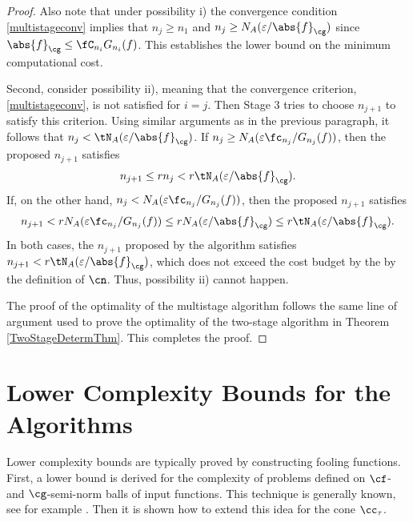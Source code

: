 \documentclass[]{elsarticle}
\theoremstyle{definition}
\theoremstyle{remark}
\newcommand{\Gnorm}[1]{\abs{#1}_{\cg}}
\begin{document}
\begin{proof}
Also note that under possibility i) the convergence condition \eqref{multistageconv} implies that $n_j \ge n_1$ and  $n_j \ge N_{A}(\varepsilon/\Gnorm{f})$ since  $\Gnorm{f} \le \fC_{n_i} G_{n_i}(f)$.  This establishes the lower bound on the minimum computational cost.

Second, consider possibility ii), meaning that the convergence criterion, \eqref{multistageconv}, is not satisfied for $i=j$.  Then Stage 3 tries to choose $n_{j+1}$ to satisfy this criterion.  Using similar arguments as in the previous paragraph, it follows that $n_j < \tN_A(\varepsilon/\Gnorm{f})$. 
If $n_j \ge N_{A}(\varepsilon \fc_{n_j}/G_{n_j}(f))$, then the proposed $n_{j+1}$ satisfies
\begin{equation*}
n_{j+1} \le r  n_j < r \tN_{A}(\varepsilon/\Gnorm{f}).
\end{equation*}
If, on the other hand, $n_j < N_{A}(\varepsilon \fc_{n_j}/G_{n_j}(f))$, then the proposed $n_{j+1}$ satisfies
\begin{equation*}
n_{j+1} < r  N_{A}(\varepsilon \fc_{n_j}/G_{n_j}(f)) \le r  N_{A}(\varepsilon/\Gnorm{f}) \le r \tN_{A}(\varepsilon/\Gnorm{f}).
\end{equation*}
In both cases, the $n_{j+1}$ proposed by the algorithm satisfies $n_{j+1} < r \tN_{A}(\varepsilon/\Gnorm{f})$, which does not exceed the cost budget by the  by the definition of $\cn$.  Thus, possibility ii) cannot happen.

The proof of the optimality of the multistage algorithm follows the same line of argument used to prove the optimality of the two-stage algorithm in Theorem \ref{TwoStageDetermThm}.  This completes the proof.
\end{proof}

\section{Lower Complexity Bounds for the Algorithms} \label{LowBoundSec}
Lower complexity bounds are typically proved by constructing fooling functions.  First, a lower bound is derived for the complexity of problems defined on $\cf$- and $\cg$-semi-norm balls of input functions.  This technique is generally known, see for example \cite[p.\ 11--12]{TraWer98}.  Then it is shown how to extend this idea for the cone $\cc_{\tau}$.  
\end{document}
